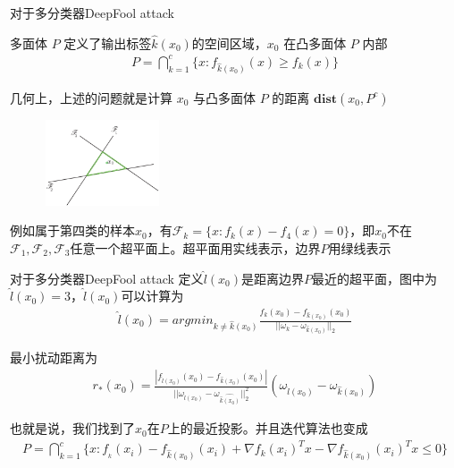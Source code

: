 \begin{frame}{对于多分类器DeepFool attack}
    \begin{multicols}{2}
        多面体 $P$ 定义了输出标签$\hat{k}(x_0)$的空间区域，$x_0$ 在凸多面体 $P$ 内部
        \begin{equation}
            \begin{aligned}
                P=\bigcap_{k=1}^c \{x:f_{\hat{k}(x_0)}(x)\geq f_k(x)\}
            \end{aligned}
        \end{equation}

        几何上，上述的问题就是计算 $x_0$ 与凸多面体 $P$ 的距离 $\textbf{dist}(x_0,P^c)$

        \begin{figure}
            \centering
            \includegraphics[width=0.3\textwidth]{docs/paperReading/deepfool/deepfool-figure4.png}
        \end{figure}

        例如属于第四类的样本$x_0$，有$\mathscr{F}_k=\{x:f_k(x)-f_4(x)=0\}$，即$x_0$不在$\mathscr{F}_1,\mathscr{F}_2,\mathscr{F}_3$任意一个超平面上。超平面用实线表示，边界$P$用绿线表示
    \end{multicols}
\end{frame}

\begin{frame}{对于多分类器DeepFool attack}
    定义$\hat{l}(x_0)$是距离边界$P$最近的超平面，图中为$\hat{l}(x_0)=3$，$\hat{l}(x_0)$可以计算为
    \begin{equation}
        \begin{aligned}
            \hat{l}(x_0)=argmin_{k\neq \hat{k}(x_0)}\frac{f_k(x_0)-f_{\hat{k}(x_0)}(x_0)}{||\omega_k-\omega_{\hat{k}(x_0)}||_2}
        \end{aligned}
    \end{equation}
    
    最小扰动距离为
    \begin{equation}
        \begin{aligned}
            r_*(x_0)=
            \frac{|f_{\hat{l}(x_0)}(x_0)-f_{\hat{k}(x_0)}(x_0)|}
            {||\omega_{\hat{l}(x_0)}-\omega_{\hat{\hat{k}(x_0)}}||_2^2}  
            (\omega_{\hat{l}(x_0)}-\omega_{\hat{k}(x_0)})
        \end{aligned}
    \end{equation}
    
    也就是说，我们找到了$x_0$在$P$上的最近投影。并且迭代算法也变成
    \begin{equation}
        \begin{aligned}
            P=\bigcap_{k=1}^c 
            \{x:f_{_k}(x_i)-f_{\hat{k}(x_0)}(x_i)+\nabla f_k(x_i)^Tx-\nabla f_{\hat{k}(x_0)}(x_i)^Tx\leq 0\}
        \end{aligned}
    \end{equation}
\end{frame}

